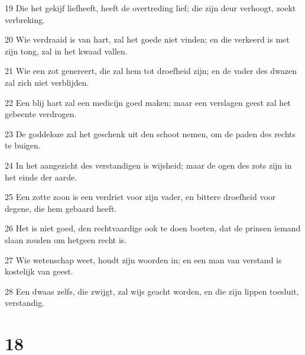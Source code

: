 \par 19 Die het gekijf liefheeft, heeft de overtreding lief; die zijn deur verhoogt, zoekt verbreking.
\par 20 Wie verdraaid is van hart, zal het goede niet vinden; en die verkeerd is met zijn tong, zal in het kwaad vallen.
\par 21 Wie een zot genereert, die zal hem tot droefheid zijn; en de vader des dwazen zal zich niet verblijden.
\par 22 Een blij hart zal een medicijn goed maken; maar een verslagen geest zal het gebeente verdrogen.
\par 23 De goddeloze zal het geschenk uit den schoot nemen, om de paden des rechts te buigen.
\par 24 In het aangezicht des verstandigen is wijsheid; maar de ogen des zots zijn in het einde der aarde.
\par 25 Een zotte zoon is een verdriet voor zijn vader, en bittere droefheid voor degene, die hem gebaard heeft.
\par 26 Het is niet goed, den rechtvaardige ook te doen boeten, dat de prinsen iemand slaan zouden om hetgeen recht is.
\par 27 Wie wetenschap weet, houdt zijn woorden in; en een man van verstand is kostelijk van geest.
\par 28 Een dwaas zelfs, die zwijgt, zal wijs geacht worden, en die zijn lippen toesluit, verstandig.

\chapter{18}

